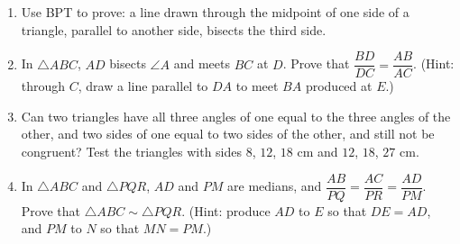 \documentclass[11pt,a4paper]{article}
\theoremstyle{brand}
\theoremstyle{branddef}
\newcommand{\tr}{\triangle}
\newenvironment{exercise}[1]
  {\par\medskip\Needspace{7\baselineskip}\noindent{\large\bfseries\color{accent}Exercise #1}
   \par\smallskip
   \begin{enumerate}[leftmargin=*,itemsep=4pt]}
  {\end{enumerate}}
\begin{document}
\begin{exercise}{R}
  \item Use BPT to prove: a line drawn through the midpoint of one side of a triangle, parallel to another side, bisects the third side.
  \item In $\tr ABC$, $AD$ bisects $\angle A$ and meets $BC$ at $D$. Prove that $\dfrac{BD}{DC}=\dfrac{AB}{AC}$. (Hint: through $C$, draw a line parallel to $DA$ to meet $BA$ produced at $E$.)
  \begin{center}\end{center}
  \item Can two triangles have all three angles of one equal to the three angles of the other, and two sides of one equal to two sides of the other, and still not be congruent? Test the triangles with sides $8$, $12$, $18$ cm and $12$, $18$, $27$ cm.
  \item In $\tr ABC$ and $\tr PQR$, $AD$ and $PM$ are medians, and $\dfrac{AB}{PQ}=\dfrac{AC}{PR}=\dfrac{AD}{PM}$. Prove that $\tr ABC\sim\tr PQR$. (Hint: produce $AD$ to $E$ so that $DE=AD$, and $PM$ to $N$ so that $MN=PM$.)
\end{exercise}
\end{document}
